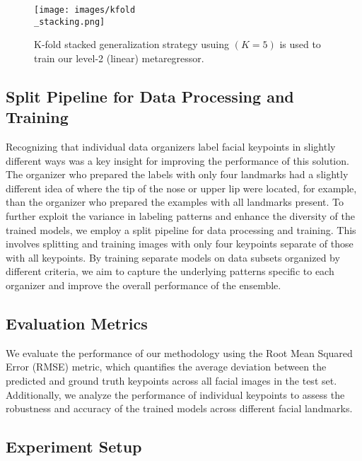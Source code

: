 \begin{figure}[h]
	\centering
	\texttt{[image: images/kfold\\\_stacking.png]}
	\caption{K-fold stacked generalization strategy usuing $(K=5)$ is used to train our level-2 (linear) metaregressor.}
	\label{fig:kfoldstacking}
\end{figure}

\subsection{Split Pipeline for Data Processing and Training}

Recognizing that individual data organizers label facial keypoints in slightly different ways was a key insight for improving the performance of this solution.  The organizer who prepared the labels with only four landmarks had a slightly different idea of where the tip of the nose or upper lip were located, for example, than the organizer who prepared the examples with all landmarks present.  To further exploit the variance in labeling patterns and enhance the diversity of the trained models, we employ a split pipeline for data processing and training. This involves splitting and training images with only four keypoints separate of those with all keypoints.  By training separate models on data subsets organized by different criteria, we aim to capture the underlying patterns specific to each organizer and improve the overall performance of the ensemble.

\subsection{Evaluation Metrics}

We evaluate the performance of our methodology using the Root Mean Squared Error (RMSE) metric, which quantifies the average deviation between the predicted and ground truth keypoints across all facial images in the test set. Additionally, we analyze the performance of individual keypoints to assess the robustness and accuracy of the trained models across different facial landmarks.

\subsection{Experiment Setup}

